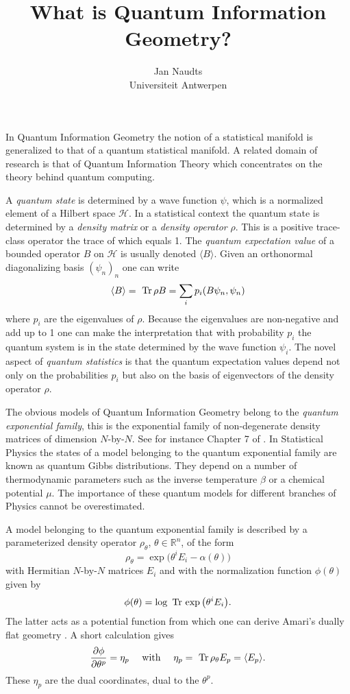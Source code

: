 \documentclass[a4paper,10pt]{article}
\title{What is Quantum Information Geometry?}
\author{Jan Naudts\\Universiteit Antwerpen}
\date{}
\def\Tr{\mbox{ {\rm Tr}\,}}
\def\Ro{{\mathbb R}}
\begin{document}
\maketitle



In Quantum Information Geometry the notion of a statistical manifold is generalized
to that of a quantum statistical manifold.
A related domain of research is that of Quantum Information Theory which concentrates
on the theory behind quantum computing.  

A {\em quantum state} is determined by a wave function $\psi$, which is a normalized element
of a Hilbert space $\mathscr H$. In a statistical context the quantum state is determined
by a {\em density matrix} or a {\em density operator} $\rho$.
This is a positive trace-class operator the trace of which equals 1.
The {\em quantum expectation value} of a bounded operator $B$ on $\mathscr H$
is usually denoted $\langle B\rangle$.
Given an orthonormal diagonalizing basis $(\psi_n)_n$ one can write
\[
 \langle B\rangle=\Tr\rho B=\sum_ip_i (B\psi_n,\psi_n)
\]
where $p_i$ are the eigenvalues of $\rho$. Because the eigenvalues are non-negative
and add up to 1 one can make the interpretation that with probability $p_i$
the quantum system is in the state determined by the wave function $\psi_i$.
The novel aspect of {\em quantum statistics} is that the quantum expectation values 
depend not only on the probabilities $p_i$ but also on the basis of eigenvectors of
the density operator $\rho$. 

The obvious models of Quantum Information Geometry belong to the {\em quantum exponential family},
this is the exponential family of non-degenerate density matrices of dimension $N$-by-$N$. 
See for instance Chapter 7 of \cite{AN00}.
In Statistical Physics the states of a model belonging to the quantum exponential family
are known as quantum Gibbs distributions.
They depend on a number of thermodynamic parameters such as the inverse temperature $\beta$
or a chemical potential $\mu$. 
The importance of these quantum models for different branches of Physics
cannot be overestimated.

A model belonging to the quantum exponential family 
is described by a parameterized density operator $\rho_\theta$, $\theta\in\Ro^n$,
of the form
\[
 \rho_\theta=\exp\big(\theta^iE_i-\alpha(\theta)\big)
\]
with Hermitian $N$-by-$N$ matrices $E_i$ and 
with the normalization function $\phi(\theta)$ given by
\[
 \phi(\theta)=\log\Tr\exp\big(\theta^iE_i\big).
\]
The latter acts as a potential function from which one 
can derive Amari's dually flat geometry \cite{AN00}.
A short calculation gives
\[
\frac{\partial\phi}{\partial\theta^p}=\eta_p
\quad\mbox{ with }\quad \eta_p=\Tr\rho_\theta E_p=\langle E_p\rangle.
\]
These $\eta_p$ are the dual coordinates, dual to the $\theta^p$.
\end{document}
